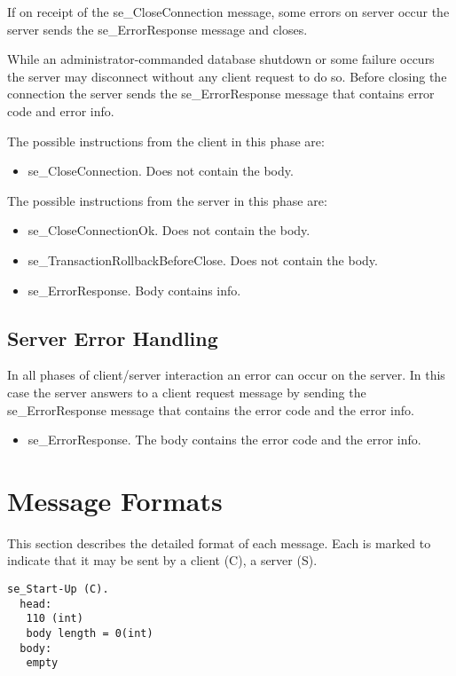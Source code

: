 \documentclass[a4paper,12pt]{article}
\begin{document}
If on receipt of the se\_CloseConnection message, some errors on server occur the server sends the se\_ErrorResponse message and closes.

While an administrator-commanded database shutdown or some failure occurs the server may disconnect without any client request to do so. Before closing the connection the server sends the se\_ErrorResponse message that contains error code and error info. 

The possible instructions from the client in this phase are:
\begin{itemize}
\item se\_CloseConnection. Does not contain the body. 
\end{itemize}

The possible instructions from the server in this phase are:
\begin{itemize}
\item se\_CloseConnectionOk. Does not contain the body. 
\item se\_TransactionRollbackBeforeClose. Does not contain the body.
\item se\_ErrorResponse. Body contains info.
\end{itemize}

\subsection{Server Error Handling}

In all phases of client/server interaction an error can occur on the server. In this case the server answers to a client request message by sending the se\_ErrorResponse message that contains the error code and the error info.

\begin{itemize}
\item se\_ErrorResponse. The body contains the error code and the error info. 
\end{itemize}



\section{Message Formats}

This section describes the detailed format of each message. Each is marked to indicate that it may be sent by a client (C), a server (S).

\begin{verbatim}
se_Start-Up (C).
  head:
   110 (int)
   body length = 0(int)
  body:
   empty
\end{verbatim}   
\end{document}
